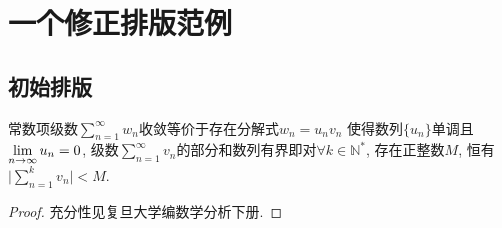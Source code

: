 \documentclass[a4paper,12pt,twoside]{ctexart}
\begin{document}
 \section{一个修正排版范例}
    \subsection{初始排版}
    \begin{theo}\label{theo}
    常数项级数$\sum\limits_{n=1}^{\infty}{w_n}$收敛等价于存在分解式$w_n={u_n}{v_n}$ 使得数列$\{u_n\}$单调且$\displaystyle\lim_{n\to{\infty}}u_n=0$, 级数$\sum\limits_{n=1}^{\infty}{v_n}$的部分和数列有界即对$\forall k\in\mathbb{ N^{*}}$, 存在正整数$ M$, 恒有$\vert\sum\limits_{n=1}^{k}{v_n}\vert< M$.
    \end{theo}
 \begin{proof}
    充分性见复旦大学编数学分析下册.


\end{proof}
\end{document}
